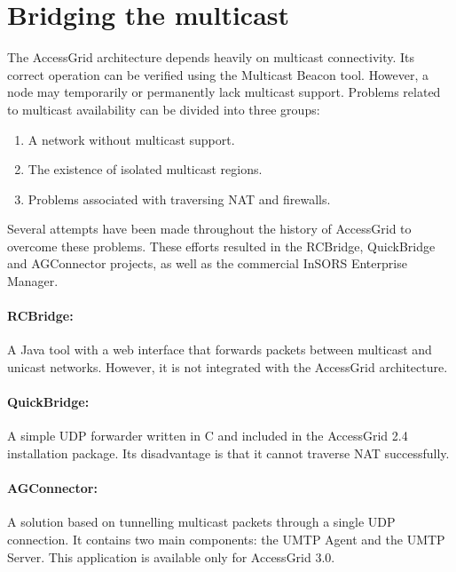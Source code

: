 \section{Bridging the multicast}

The AccessGrid architecture depends heavily on multicast connectivity. Its correct operation can be verified using the Multicast Beacon tool. However, a node may temporarily or permanently lack multicast support. Problems related to multicast availability can be divided into three groups:

\begin{enumerate}
\item A network without multicast support.
\item The existence of isolated multicast regions.
\item Problems associated with traversing NAT and firewalls.
\end{enumerate}

Several attempts have been made throughout the history of AccessGrid to overcome these problems. These efforts resulted in the RCBridge, QuickBridge and AGConnector projects, as well as the commercial InSORS Enterprise Manager.

\paragraph*{RCBridge:}
A Java tool with a web interface that forwards packets between multicast and unicast networks. However, it is not integrated with the AccessGrid architecture.

\paragraph*{QuickBridge:}
A simple UDP forwarder written in C and included in the AccessGrid 2.4 installation package. Its disadvantage is that it cannot traverse NAT successfully.

\paragraph*{AGConnector:}
A solution based on tunnelling multicast packets through a single UDP connection. It contains two main components: the UMTP Agent and the UMTP Server. This application is available only for AccessGrid 3.0.

